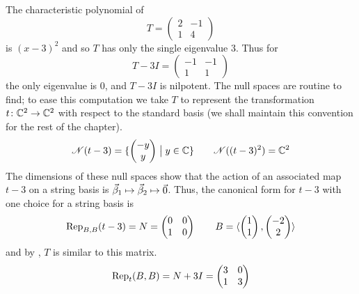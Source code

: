 \begin{example}   \label{ex:SingJordBlock}
The characteristic polynomial of
\begin{equation*}
  T=\begin{pmatrix}
      2  &-1  \\
      1  &4
    \end{pmatrix}
\end{equation*}
is \( (x-3)^2 \) and so \( T \) has only the single eigenvalue \( 3 \).
Thus for 
\begin{equation*}
  T-3I=\begin{pmatrix}
     -1  &-1  \\
      1  &1
    \end{pmatrix}
\end{equation*}
the only eigenvalue is \( 0 \), and \( T-3I \) is nilpotent.
The null spaces are routine to find; to ease this computation we take 
$T$ to represent the transformation $\map{t}{\C^2}{\C^2}$ with respect to
the standard basis (we shall maintain this convention
for the rest of the chapter). 
\begin{equation*}
   \nullspace{t-3}=\set{\colvec{-y \\ y}\suchthat y\in\C}
   \qquad
   \nullspace{(t-3)^2}=\C^2
\end{equation*}
The dimensions of these null spaces
show that the action of an associated map $t-3$ on a string basis is
$\vec{\beta}_1\mapsto\vec{\beta}_2\mapsto\zero$.
Thus, the canonical form for $t-3$
with one choice for a string basis is
\begin{equation*}
  \rep{t-3}{B,B}
  =N
  =\begin{pmatrix}
      0  &0   \\
      1  &0
    \end{pmatrix}
  \qquad
  B=\sequence{\colvec{1 \\ 1},\colvec{-2 \\ 2}}
\end{equation*}
and by , \( T \) is similar to
this matrix.
\begin{equation*}
  \rep{B,B}{t}=
  N+3I=
  \begin{pmatrix}
     3  &0  \\
     1  &3
  \end{pmatrix}
\end{equation*}


\end{example}
